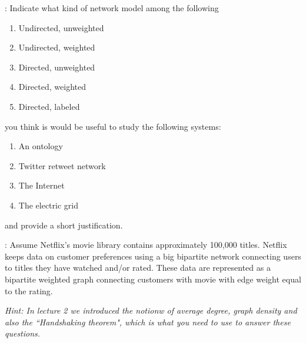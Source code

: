 \documentclass[11pt]{exam}
\begin{document}
\clearpage
\begin{questions}
:
Indicate what kind of network model among the following
\begin{enumerate}
\item Undirected, unweighted
\item Undirected, weighted
\item Directed, unweighted
\item Directed, weighted
\item Directed, labeled
\end{enumerate}
you think is would be useful to study the following systems:
\begin{enumerate}
\item An ontology 
\item Twitter retweet network
\item The Internet
\item The electric grid
\end{enumerate}
and provide a short justification. 

:
 Assume Netflix's movie library contains
approximately 100,000 titles. 
 Netflix keeps data on customer preferences using a big bipartite network connecting users to titles they have watched and/or rated. These data are represented as a bipartite weighted graph connecting customers with movie with edge weight equal to the rating. 
{\color{blue}\it Hint: In lecture 2 we introduced the notionw of average degree, graph density and also the ``Handshaking theorem", which is what you need to use to answer these questions. } 



\end{questions}
\end{document}
